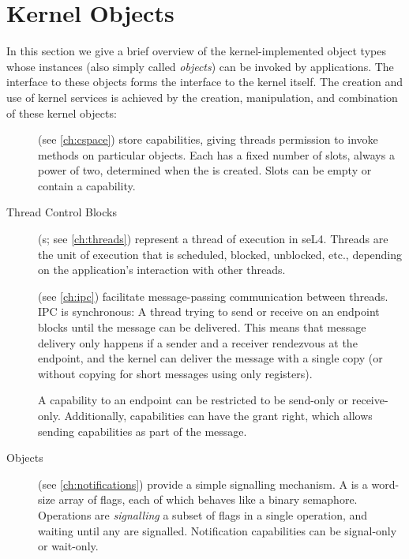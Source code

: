 \section{Kernel Objects}
\label{s:sel4_internals}

In this section we give a brief overview of the kernel-implemented
object types whose instances (also simply called \emph{objects}) can be invoked by applications. The interface to these
objects forms the interface to the kernel itself. The creation and use
of kernel services is achieved by the creation,
manipulation, and combination of these kernel objects:

\begin{description}

    \item[] (see \autoref{ch:cspace}) store capabilities, giving threads permission to
    invoke methods on particular objects.
    Each  has a fixed number of slots,
    always a power of two, determined when the  is created. Slots
    can be empty or contain a capability.

    \item[Thread Control Blocks] (s; see \autoref{ch:threads}) represent a thread of
    execution in seL4. Threads are the unit of execution that is
    scheduled, blocked, unblocked, etc., depending on the application's
    interaction with other threads.

    \item[] (see \autoref{ch:ipc}) facilitate message-passing
    communication between threads. IPC is synchronous: A thread
    trying to send or receive on an endpoint blocks until the message
    can be delivered. This means that message delivery only happens if
    a sender and a receiver rendezvous at the endpoint, and the
    kernel can deliver the message with a single copy (or without
    copying for short messages using only registers).

    A capability to an endpoint can be restricted to be
    send-only or receive-only. Additionally, 
    capabilities can have the grant right, which allows sending
    capabilities as part of the message.

    \item[ Objects] (see \autoref{ch:notifications})
      provide a simple signalling mechanism. A 
      is a word-size array of flags, each of which behaves like a binary semaphore. Operations
      are \emph{signalling} a subset of flags in a single operation,
      and waiting until any are signalled. Notification capabilities
      can be signal-only or wait-only.


\end{description}
